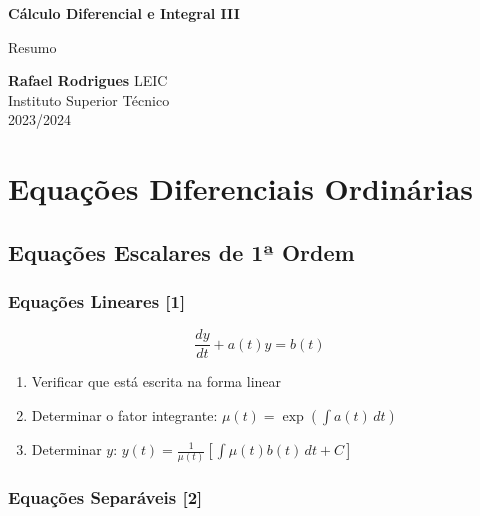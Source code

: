 \documentclass[11pt, a4paper]{article}
\begin{document}
\begin{titlepage}
    \begin{center}
        \vspace*{5cm}

        \textbf{\LARGE Cálculo Diferencial e Integral III}
        \vspace{1cm}

        \Large Resumo
        \vspace{2cm}

        \textbf{Rafael Rodrigues}
        \vfill
        LEIC \\
        Instituto Superior Técnico \\
        2023/2024
    \end{center}
\end{titlepage}

\tableofcontents

\newpage


\section{Equações Diferenciais Ordinárias}

\subsection{Equações Escalares de 1ª Ordem}

\subsubsection{Equações Lineares [1]}

\begin{equation*}
    \frac{dy}{dt} + a(t)y = b(t)
\end{equation*}

\begin{enumerate}
    \item Verificar que está escrita na forma linear
    \item Determinar o fator integrante: $\displaystyle \mu(t) = \exp\left(\int a(t) \, dt \right)$
    \item Determinar $y$:
          $\displaystyle y(t) = \frac{1}{\mu(t)}\left[\int \mu(t)b(t) \, dt + C\right]$
\end{enumerate}

\subsubsection{Equações Separáveis [2]}
\end{document}
